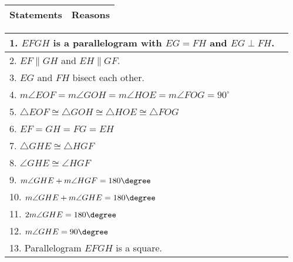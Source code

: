 \begin{center}
\begin{tabularx}{\textwidth}{|Y|Y|}
\hline
\textbf{Statements} & \textbf{Reasons}  \\
\hline
\end{tabularx} 
\begin{tabularx}{\textwidth}{|X|X|}
\hline
1. \( EFGH \) is a parallelogram with \( EG = FH \) and \( EG \perp FH \). & \\
\hline
2. \( EF \parallel GH \) and \( EH \parallel GF \). & \\
\hline
3. \( EG \) and \( FH \) bisect each other. & \\
\hline
4. \( m\angle EOF = m\angle GOH = m\angle HOE = m\angle FOG = 90^\circ \) & \\
\hline
5. \( \triangle EOF \cong \triangle GOH \cong \triangle HOE \cong \triangle FOG \) & \\
\hline
6. \( EF = GH = FG = EH \) & \\
\hline
7. \( \bigtriangleup GHE \cong \bigtriangleup HGF \) & \\
\hline
8. \( \angle GHE \cong \angle HGF \) & \\
\hline
9. \( m\angle GHE + m\angle HGF = 180\degree \) & \\
\hline
10. \( m\angle GHE + m\angle GHE = 180\degree \) & \\
\hline
11. \( 2m\angle GHE = 180\degree \) & \\
\hline
12. \( m\angle GHE = 90\degree \) & \\
\hline
13. Parallelogram \( EFGH \) is a square. & \\
\hline
\end{tabularx}
\end{center}


